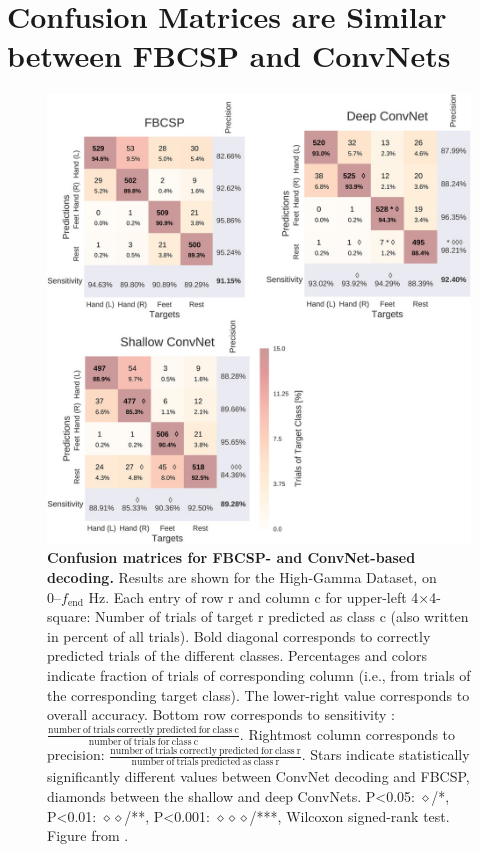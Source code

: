 \section{Confusion Matrices are Similar between FBCSP and
ConvNets}\label{confusion-matrices-are-similar-between-fbcsp-and-convnets}


\begin{figure}[h!tb]
    \myfloatalign
    \includegraphics[width=0.9\linewidth]{images/Confusion_Mats.jpg}
    \caption[Confusion matrices for FBCSP- and ConvNet-based decoding]{
\textbf{Confusion matrices for FBCSP- and ConvNet-based decoding.}
Results are shown for the High-Gamma Dataset, on $0–f_\textrm{end}$
Hz. Each entry of row r and column c for upper-left 4×4-square: Number
of trials of target r predicted as class c (also written in percent of
all trials). Bold diagonal corresponds to correctly predicted trials of
the different classes. Percentages and colors indicate fraction of
trials of corresponding column (i.e.,
from trials of the corresponding target class). The lower-right
value corresponds to overall accuracy. Bottom row corresponds to
sensitivity
: $\frac{\mathrm{number\ of\ trials\ correctly\ predicted\ for\ 
class\ c}}{\mathrm{number\ of\ trials\ for\ class\ c}}$. Rightmost column corresponds to
precision: $\frac{\mathrm{number\ of\ trials\ correctly\ predicted\ for\ 
class\ r}}{\mathrm{number\ of\ trials\ predicted\ as\ class\ r}}$. Stars indicate statistically
significantly different values between ConvNet decoding and FBCSP, diamonds between the shallow and deep ConvNets. P\textless0.05: $\diamond$/*,
P\textless0.01: $\diamond\diamond$/**, P\textless0.001:
$\diamond\diamond\diamond$/***, Wilcoxon signed-rank test. Figure from
\citet{schirrmeisterdeephbm2017}.
}
\label{confusion-mat-figure}
\end{figure}



